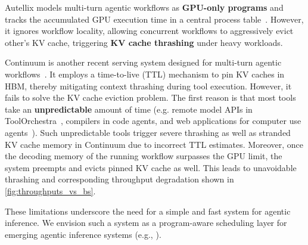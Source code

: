 Autellix models multi-turn agentic workflows as \textbf{GPU-only programs} and tracks the accumulated GPU execution time in a central process table~\citep{luo2025autellixefficientservingengine}. However, it ignores workflow locality, allowing concurrent workflows to aggressively evict other's KV cache, triggering \textbf{KV cache thrashing} under heavy workloads.


Continuum is another recent serving system designed for multi-turn agentic workflows~\cite{li2025continuumefficientrobustmultiturn}. It employs a time-to-live (TTL) mechanism to pin KV caches in HBM, thereby mitigating context thrashing during tool execution.
However, it fails to solve the KV cache eviction problem. The first reason is that most tools take an \textbf{unpredictable} amount of time (e.g. remote model APIs in ToolOrchestra~\citep{su2025toolorchestraelevatingintelligenceefficient}, compilers in code agents, and web applications for computer use agents~\citep{zhou2024webarenarealisticwebenvironment}).
Such unpredictable tools trigger severe thrashing as well as stranded KV cache memory in Continuum due to incorrect TTL estimates.
Moreover, once the decoding memory of the running workflow surpasses the GPU limit, the system preempts and evicts pinned KV cache as well. This leads to unavoidable thrashing and corresponding throughput degradation shown in \autoref{fig:throughputs_vs_bs}.


These limitations underscore the need for a simple and fast system for agentic inference. We envision such a system as a program-aware scheduling layer for emerging agentic inference systems (e.g., \citet{zhang2026megaflow}).

